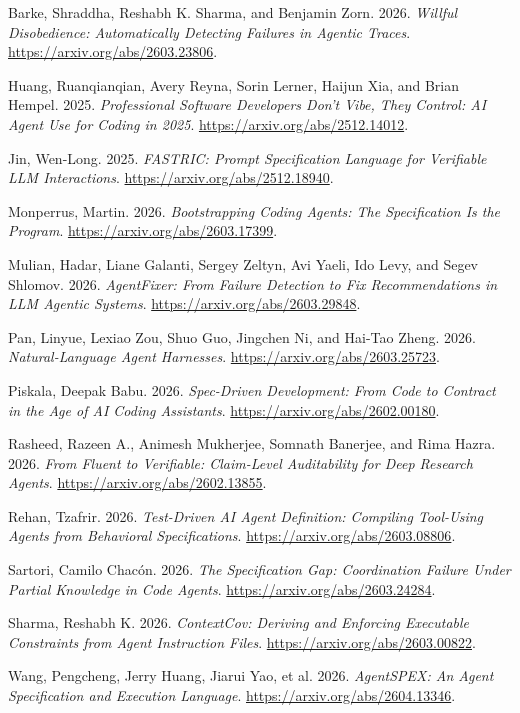 \documentclass[
]{article}
\newlength{\cslhangindent}
\newenvironment{CSLReferences}[2] %
 {\begin{list}{}{%
  \setlength{\itemindent}{0pt}
  \setlength{\leftmargin}{0pt}
  \setlength{\parsep}{0pt}
  \ifodd #1
   \setlength{\leftmargin}{\cslhangindent}
   \setlength{\itemindent}{-1\cslhangindent}
  \fi
  \setlength{\itemsep}{#2\baselineskip}}}
 {\end{list}}
\begin{document}
\protect{}\label{refs}
\begin{CSLReferences}{1}{1}
Barke, Shraddha, Reshabh K. Sharma, and Benjamin Zorn. 2026.
\emph{Willful Disobedience: Automatically Detecting Failures in Agentic
Traces}. \url{https://arxiv.org/abs/2603.23806}.

Huang, Ruanqianqian, Avery Reyna, Sorin Lerner, Haijun Xia, and Brian
Hempel. 2025. \emph{Professional Software Developers Don't Vibe, They
Control: AI Agent Use for Coding in 2025}.
\url{https://arxiv.org/abs/2512.14012}.

Jin, Wen-Long. 2025. \emph{FASTRIC: Prompt Specification Language for
Verifiable LLM Interactions}. \url{https://arxiv.org/abs/2512.18940}.

Monperrus, Martin. 2026. \emph{Bootstrapping Coding Agents: The
Specification Is the Program}. \url{https://arxiv.org/abs/2603.17399}.

Mulian, Hadar, Liane Galanti, Sergey Zeltyn, Avi Yaeli, Ido Levy, and
Segev Shlomov. 2026. \emph{AgentFixer: From Failure Detection to Fix
Recommendations in LLM Agentic Systems}.
\url{https://arxiv.org/abs/2603.29848}.

Pan, Linyue, Lexiao Zou, Shuo Guo, Jingchen Ni, and Hai-Tao Zheng. 2026.
\emph{Natural-Language Agent Harnesses}.
\url{https://arxiv.org/abs/2603.25723}.

Piskala, Deepak Babu. 2026. \emph{Spec-Driven Development: From Code to
Contract in the Age of AI Coding Assistants}.
\url{https://arxiv.org/abs/2602.00180}.

Rasheed, Razeen A., Animesh Mukherjee, Somnath Banerjee, and Rima Hazra.
2026. \emph{From Fluent to Verifiable: Claim-Level Auditability for Deep
Research Agents}. \url{https://arxiv.org/abs/2602.13855}.

Rehan, Tzafrir. 2026. \emph{Test-Driven AI Agent Definition: Compiling
Tool-Using Agents from Behavioral Specifications}.
\url{https://arxiv.org/abs/2603.08806}.

Sartori, Camilo Chacón. 2026. \emph{The Specification Gap: Coordination
Failure Under Partial Knowledge in Code Agents}.
\url{https://arxiv.org/abs/2603.24284}.

Sharma, Reshabh K. 2026. \emph{ContextCov: Deriving and Enforcing
Executable Constraints from Agent Instruction Files}.
\url{https://arxiv.org/abs/2603.00822}.

Wang, Pengcheng, Jerry Huang, Jiarui Yao, et al. 2026. \emph{AgentSPEX:
An Agent Specification and Execution Language}.
\url{https://arxiv.org/abs/2604.13346}.

\end{CSLReferences}
\end{document}
